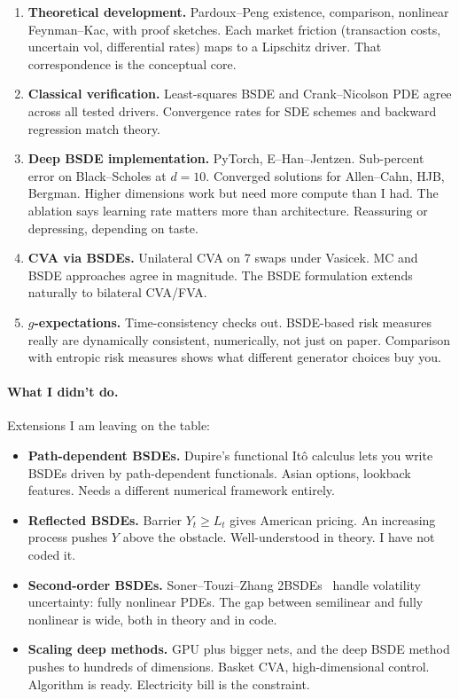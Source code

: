 \documentclass[11pt]{article}
\theoremstyle{definition}
\theoremstyle{remark}
\begin{document}
\begin{enumerate}
  \item \textbf{Theoretical development.} Pardoux--Peng existence,
  comparison, nonlinear Feynman--Kac, with proof sketches. Each market
  friction (transaction costs, uncertain vol, differential rates) maps
  to a Lipschitz driver. That correspondence is the conceptual core.

  \item \textbf{Classical verification.} Least-squares BSDE and
  Crank--Nicolson PDE agree across all tested drivers. Convergence
  rates for SDE schemes and backward regression match theory.

  \item \textbf{Deep BSDE implementation.} PyTorch, E--Han--Jentzen.
  Sub-percent error on Black--Scholes at $d = 10$. Converged solutions
  for Allen--Cahn, HJB, Bergman. Higher dimensions work but need more
  compute than I had. The ablation says learning rate matters more than
  architecture. Reassuring or depressing, depending on taste.

  \item \textbf{CVA via BSDEs.} Unilateral CVA on 7 swaps under
  Vasicek. MC and BSDE approaches agree in magnitude. The BSDE
  formulation extends naturally to bilateral CVA/FVA.

  \item \textbf{$g$-expectations.} Time-consistency checks out.
  BSDE-based risk measures really are dynamically consistent,
  numerically, not just on paper. Comparison with entropic risk
  measures shows what different generator choices buy you.
\end{enumerate}

\paragraph{What I didn't do.}
Extensions I am leaving on the table:
\begin{itemize}
  \item \textbf{Path-dependent BSDEs.} Dupire's functional It\^{o}
  calculus lets you write BSDEs driven by path-dependent functionals.
  Asian options, lookback features. Needs a different numerical
  framework entirely.
  \item \textbf{Reflected BSDEs.} Barrier $Y_t \ge L_t$ gives American
  pricing. An increasing process pushes $Y$ above the obstacle.
  Well-understood in theory. I have not coded it.
  \item \textbf{Second-order BSDEs.} Soner--Touzi--Zhang
  2BSDEs~\cite{sonertouziizhang2012wellposedness} handle volatility
  uncertainty: fully nonlinear PDEs. The gap between semilinear and
  fully nonlinear is wide, both in theory and in code.
  \item \textbf{Scaling deep methods.} GPU plus bigger nets, and the
  deep BSDE method pushes to hundreds of dimensions. Basket CVA,
  high-dimensional control. Algorithm is ready. Electricity bill
  is the constraint.
\end{itemize}
\end{document}
